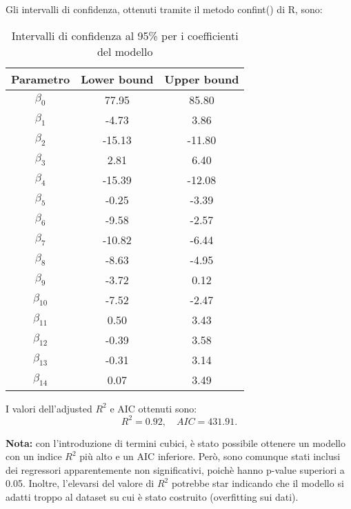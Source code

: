 Gli intervalli di confidenza, ottenuti tramite il metodo confint() di R, sono:
\begin{table}[H]
	\centering
	\begin{tabular}{|c|c|c|}
		\hline
		\textbf{Parametro} & \textbf{Lower bound} & \textbf{Upper bound} \\
		\hline
		$\beta_0$   & 77.95  & 85.80 \\
		$\beta_1$   & -4.73 & 3.86 \\
		$\beta_2$   & -15.13 & -11.80 \\
		$\beta_3$   & 2.81   & 6.40 \\
		$\beta_4$   & -15.39  & -12.08 \\
		$\beta_5$   & -0.25 & -3.39 \\
		$\beta_6$   & -9.58  & -2.57 \\
		$\beta_7$   & -10.82  & -6.44 \\
		$\beta_8$   & -8.63 & -4.95 \\
		$\beta_9$   & -3.72  & 0.12 \\
		$\beta_{10}$ & -7.52  & -2.47 \\
		$\beta_{11}$ & 0.50  & 3.43 \\
		$\beta_{12}$ & -0.39  & 3.58 \\
		$\beta_{13}$ & -0.31  & 3.14 \\
		$\beta_{14}$ & 0.07  & 3.49 \\
		\hline
	\end{tabular}
	\caption{Intervalli di confidenza al 95\% per i coefficienti del modello}
	\label{tab:ci_coefficienti}
\end{table}
I valori dell'adjusted $R^2$  e AIC ottenuti sono:
\begin{equation*}
	R^2 =      0.92, \quad AIC=431.91.
\end{equation*}

\textbf{Nota:} con l'introduzione di termini cubici, è stato possibile ottenere un modello con un indice $R^2$ più alto e un AIC inferiore. Però, sono comunque stati inclusi dei regressori apparentemente non significativi, poichè hanno p-value superiori a 0.05. Inoltre, l'elevarsi del valore di $R^2$ potrebbe star indicando che il modello si adatti troppo al dataset su cui è stato costruito (overfitting sui dati).
